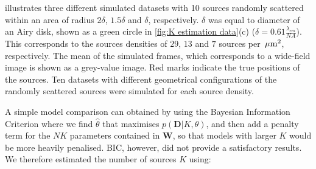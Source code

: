  illustrates three different simulated datasets with 10 sources randomly scattered within an area of radius $2\delta$, $1.5\delta$ and $\delta$, respectively. $\delta$ was equal to diameter of an Airy disk, shown as a green circle in \autoref{fig:K estimation data}(c) ($\delta=0.61\frac{\lambda_{em}}{NA}$). This corresponds to the sources densities of $29$, $13$ and $7$ sources per $\, \mathrm{\mu m}^{2}$, respectively. The mean of the simulated frames, which corresponds to a wide-field image is shown as a grey-value image. Red marks indicate the true positions of the sources. Ten datasets with different geometrical configurations of the randomly scattered sources were simulated for each source density. 

A simple model comparison can obtained by using the Bayesian Information Criterion \cite{Bishop2006} where we find $\hat{\theta}$ that maximises $p(\bm{D}|K, \theta)$, and then add a penalty term for the $NK$ parameters contained in $\bm{W}$, so that models with larger $K$ would be more heavily penalised. BIC, however, did not provide a satisfactory results. We therefore estimated the number of sources $K$ using:

